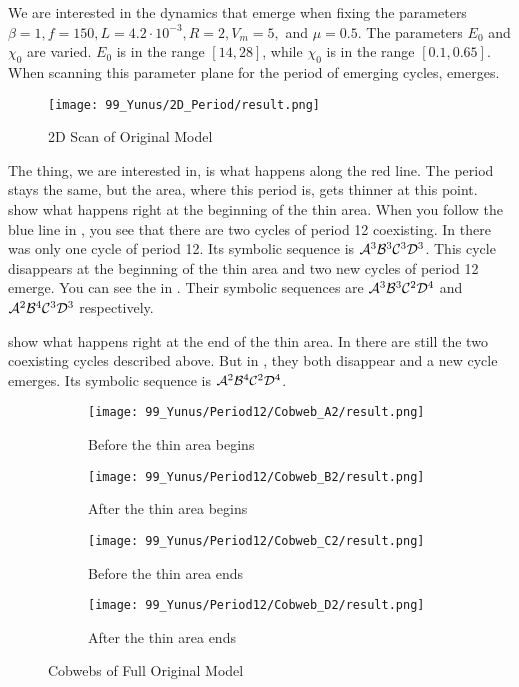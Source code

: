 We are interested in the dynamics that emerge when fixing the parameters $\beta = 1, f = 150, L = 4.2 \cdot 10^{-3}, R = 2, V_m = 5,$ and $\mu = 0.5$.
The parameters $E_0$ and $\chi_0$ are varied.
$E_0$ is in the range $[14, 28]$, while $\chi_0$ is in the range $[0.1, 0.65]$.
When scanning this parameter plane for the period of emerging cycles,  emerges.

\begin{figure}
    \centering
    \texttt{[image: 99\_Yunus/2D\_Period/result.png]}
    \caption{2D Scan of Original Model}
    \label{fig:yunus.2pi.2d.full}
\end{figure}

The thing, we are interested in, is what happens along the red line.
The period stays the same, but the area, where this period is, gets thinner at this point.
 show what happens right at the beginning of the thin area.
When you follow the blue line in , you see that there are two cycles of period 12 coexisting.
In  there was only one cycle of period 12.
Its symbolic sequence is $\mathcal{A}^3\mathcal{B}^3\mathcal{C}^3\mathcal{D}^3$.
This cycle disappears at the beginning of the thin area and two new cycles of period 12 emerge.
You can see the in .
Their symbolic sequences are $\mathcal{A}^3\mathcal{B}^3\mathcal{C}^2\mathcal{D}^4$ and $\mathcal{A}^2\mathcal{B}^4\mathcal{C}^3\mathcal{D}^3$ respectively.

 show what happens right at the end of the thin area.
In  there are still the two coexisting cycles described above.
But in , they both disappear and a new cycle emerges.
Its symbolic sequence is $\mathcal{A}^2\mathcal{B}^4\mathcal{C}^2\mathcal{D}^4$.

\begin{figure}
    \centering
    \begin{subfigure}{0.4\textwidth}
        \centering
        \texttt{[image: 99\_Yunus/Period12/Cobweb\_A2/result.png]}
        \caption{Before the thin area begins}
        \label{fig:yunus.2pi.CobwebA2}
    \end{subfigure}
    \begin{subfigure}{0.4\textwidth}
        \centering
        \texttt{[image: 99\_Yunus/Period12/Cobweb\_B2/result.png]}
        \caption{After the thin area begins}
        \label{fig:yunus.2pi.CobwebB2}
    \end{subfigure}
    \begin{subfigure}{0.4\textwidth}
        \centering
        \texttt{[image: 99\_Yunus/Period12/Cobweb\_C2/result.png]}
        \caption{Before the thin area ends}
        \label{fig:yunus.2pi.CobwebC2}
    \end{subfigure}
    \begin{subfigure}{0.4\textwidth}
        \centering
        \texttt{[image: 99\_Yunus/Period12/Cobweb\_D2/result.png]}
        \caption{After the thin area ends}
        \label{fig:yunus.2pi.CobwebD2}
    \end{subfigure}
    \caption{Cobwebs of Full Original Model}
\end{figure}

